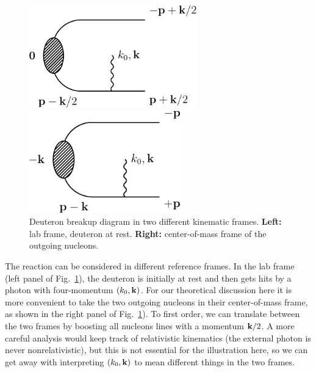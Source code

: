 \begin{figure}[htbp]
\centering
\begin{minipage}{0.45\textwidth}
 \centering
 \includegraphics[height=12em,clip]{DeutBreakup-IA-kin-Dcm}
\end{minipage}
\hspace{0.5em}
\begin{minipage}{0.45\textwidth}
 \centering
 \includegraphics[height=12em,clip]{DeutBreakup-IA-kin-NNcm}
\end{minipage}
\caption{Deuteron breakup diagram in two different kinematic frames.
 \textbf{Left:} lab frame, deuteron at rest.
 \textbf{Right:} center-of-mass frame of the outgoing nucleons.
}
\label{fig:DeutDis}
\end{figure}

The reaction can be considered in different reference frames.  In the lab 
frame (left panel of Fig.~\ref{fig:DeutDis}), the deuteron is initially at rest 
and then gets hits by a photon with four-momentum $(k_0,\mathbf{k})$.  For our 
theoretical discussion here it is more convenient to take the two outgoing 
nucleons in their center-of-mass frame, as shown in the right panel of 
Fig.~\ref{fig:DeutDis}).  To first order, we can translate between the two 
frames by boosting all nucleons lines with a momentum $\mathbf{k}/2$.  A more careful 
analysis would keep track of relativistic kinematics (the external photon is 
never nonrelativistic), but this is not essential for the illustration here, so 
we can get away with interpreting $(k_0,\mathbf{k})$ to mean different things in the 
two frames.

